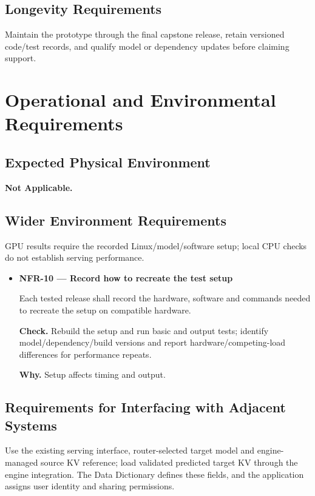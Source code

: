 \documentclass[12pt]{article}
\begin{document}
\subsection{Longevity Requirements}
Maintain the prototype through the final capstone release, retain versioned
code/test records, and qualify model or dependency updates before claiming support.


\section{Operational and Environmental Requirements}


\subsection{Expected Physical Environment}
\textbf{Not Applicable.}


\subsection{Wider Environment Requirements}
GPU results require the recorded Linux/model/software setup; local CPU checks do not establish serving performance.

\begin{itemize}
\item {}\label{req:NFR-10}
\textbf{NFR-10 --- Record how to recreate the test setup}\par
Each tested release shall record the hardware, software and commands needed to recreate the setup on compatible hardware.\par
\textbf{Check.} Rebuild the setup and run basic and output tests; identify model/dependency/build versions and report hardware/competing-load differences for performance repeats.\par
\textbf{Why.} Setup affects timing and output.
\end{itemize}

\subsection{Requirements for Interfacing with Adjacent Systems}
Use the existing serving interface, router-selected target model and
engine-managed source KV reference; load validated predicted target KV through
the engine integration. The Data Dictionary defines these fields, and the
application assigns user identity and sharing permissions.
\end{document}
